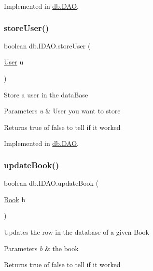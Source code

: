 Implemented in \hyperlink{classdb_1_1_d_a_o_a036246b8124d7ac8a36e3eaafd3eb81a}{db.\+D\+AO}.

\mbox{\label{interfacedb_1_1_i_d_a_o_a5b1f408c9a25305e977e962faa38b026}} 
\subsubsection{\texorpdfstring{store\+User()}{storeUser()}}
{\footnotesize\ttfamily boolean db.\+I\+D\+A\+O.\+store\+User (\begin{DoxyParamCaption}\item[{\hyperlink{classserver_1_1data_1_1_user}{User}}]{u }\end{DoxyParamCaption})}

Store a user in the data\+Base 
\begin{DoxyParams}{Parameters}
{\em u} & User you want to store \\
\hline
\end{DoxyParams}
\begin{DoxyReturn}{Returns}
true of false to tell if it worked 
\end{DoxyReturn}


Implemented in \hyperlink{classdb_1_1_d_a_o_a1600c5d7d28eb225fc7c244fdfb16150}{db.\+D\+AO}.

\mbox{\label{interfacedb_1_1_i_d_a_o_a202354d7a3e1231687d543e82c15a6f5}} 
\subsubsection{\texorpdfstring{update\+Book()}{updateBook()}}
{\footnotesize\ttfamily boolean db.\+I\+D\+A\+O.\+update\+Book (\begin{DoxyParamCaption}\item[{\hyperlink{classserver_1_1data_1_1_book}{Book}}]{b }\end{DoxyParamCaption})}

Updates the row in the database of a given Book 
\begin{DoxyParams}{Parameters}
{\em b} & the book \\
\hline
\end{DoxyParams}
\begin{DoxyReturn}{Returns}
true of false to tell if it worked 
\end{DoxyReturn}


